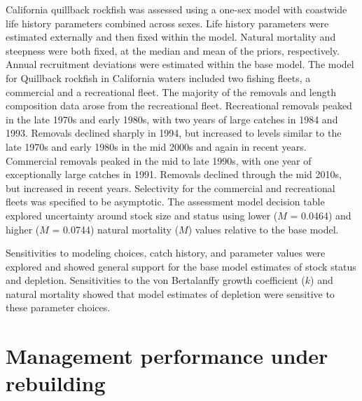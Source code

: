 \documentclass[11pt,
  english,
  a4paper,
]{article}
\begin{document}
California quillback rockfish was assessed using a one-sex model with coastwide life history parameters combined across sexes. Life history parameters were estimated externally and then fixed within the model. Natural mortality and steepness were both fixed, at the median and mean of the priors, respectively. Annual recruitment deviations were estimated within the base model. The model for Quillback rockfish in California waters included two fishing fleets, a commercial and a recreational fleet. The majority of the removals and length composition data arose from the recreational fleet. Recreational removals peaked in the late 1970s and early 1980s, with two years of large catches in 1984 and 1993. Removals declined sharply in 1994, but increased to levels similar to the late 1970s and early 1980s in the mid 2000s and again in recent years. Commercial removals peaked in the mid to late 1990s, with one year of exceptionally large catches in 1991. Removals declined through the mid 2010s, but increased in recent years. Selectivity for the commercial and recreational fleets was specified to be asymptotic. The assessment model decision table explored uncertainty around stock size and status using lower ({\(M\)\leavevmode\tagmcend\tagstructend} = 0.0464) and higher ({\(M\)\leavevmode\tagmcend\tagstructend} = 0.0744) natural mortality ({\(M\)\leavevmode\tagmcend\tagstructend}) values relative to the base model.

\leavevmode\tagmcend\tagstructend\par


Sensitivities to modeling choices, catch history, and parameter values were explored and showed general support for the base model estimates of stock status and depletion. Sensitivities to the von Bertalanffy growth coefficient ({\(k\)\leavevmode\tagmcend\tagstructend}) and natural mortality showed that model estimates of depletion were sensitive to these parameter choices.

\leavevmode\tagmcend\tagstructend\par


\hypertarget{management-performance-under-rebuilding}{%
\section{Management performance under rebuilding}\label{management-performance-under-rebuilding}}
\end{document}
